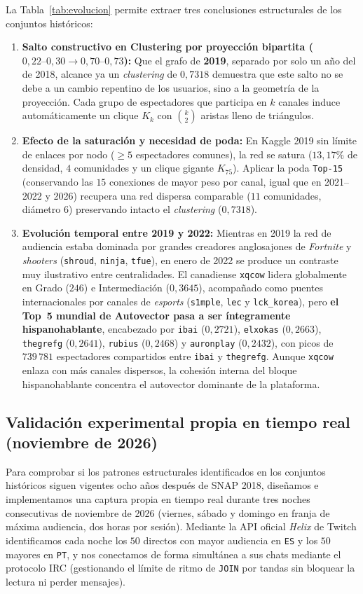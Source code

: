 \documentclass[11pt,a4paper]{article}
\begin{document}
La Tabla~\ref{tab:evolucion} permite extraer tres conclusiones estructurales de los conjuntos históricos:
\begin{enumerate}[leftmargin=*, itemsep=2pt]
  \item \textbf{Salto constructivo en Clustering por proyección bipartita ($0,22\text{--}0,30 \to 0,70\text{--}0,73$):} Que el grafo de \textbf{2019}, separado por solo un año del de 2018, alcance ya un \textit{clustering} de $0,7318$ demuestra que este salto no se debe a un cambio repentino de los usuarios, sino a la geometría de la proyección. Cada grupo de espectadores que participa en $k$ canales induce automáticamente un clique $K_k$ con $\binom{k}{2}$ aristas lleno de triángulos.
  \item \textbf{Efecto de la saturación y necesidad de poda:} En Kaggle 2019 sin límite de enlaces por nodo ($\ge 5$ espectadores comunes), la red se satura ($13,17\%$ de densidad, $4$ comunidades y un clique gigante $K_{75}$). Aplicar la poda \texttt{Top-15} (conservando las $15$ conexiones de mayor peso por canal, igual que en 2021--2022 y 2026) recupera una red dispersa comparable ($11$ comunidades, diámetro $6$) preservando intacto el \textit{clustering} ($0,7318$).
  \item \textbf{Evolución temporal entre 2019 y 2022:} Mientras en 2019 la red de audiencia estaba dominada por grandes creadores anglosajones de \textit{Fortnite} y \textit{shooters} (\texttt{shroud}, \texttt{ninja}, \texttt{tfue}), en enero de 2022 se produce un contraste muy ilustrativo entre centralidades. El canadiense \texttt{xqcow} lidera globalmente en Grado ($246$) e Intermediación ($0,3645$), acompañado como puentes internacionales por canales de \textit{esports} (\texttt{s1mple}, \texttt{lec} y \texttt{lck\_korea}), pero \textbf{el Top~5 mundial de Autovector pasa a ser íntegramente hispanohablante}, encabezado por \texttt{ibai} ($0,2721$), \texttt{elxokas} ($0,2663$), \texttt{thegrefg} ($0,2641$), \texttt{rubius} ($0,2468$) y \texttt{auronplay} ($0,2432$), con picos de $739\,781$ espectadores compartidos entre \texttt{ibai} y \texttt{thegrefg}. Aunque \texttt{xqcow} enlaza con más canales dispersos, la cohesión interna del bloque hispanohablante concentra el autovector dominante de la plataforma.
\end{enumerate}

\subsection{Validación experimental propia en tiempo real (noviembre de 2026)}
Para comprobar si los patrones estructurales identificados en los conjuntos históricos siguen vigentes ocho años después de SNAP 2018, diseñamos e implementamos una captura propia en tiempo real durante tres noches consecutivas de noviembre de 2026 (viernes, sábado y domingo en franja de máxima audiencia, dos horas por sesión). Mediante la API oficial \textit{Helix} de Twitch identificamos cada noche los $50$ directos con mayor audiencia en \texttt{ES} y los $50$ mayores en \texttt{PT}, y nos conectamos de forma simultánea a sus chats mediante el protocolo IRC (gestionando el límite de ritmo de \texttt{JOIN} por tandas sin bloquear la lectura ni perder mensajes).
\end{document}

